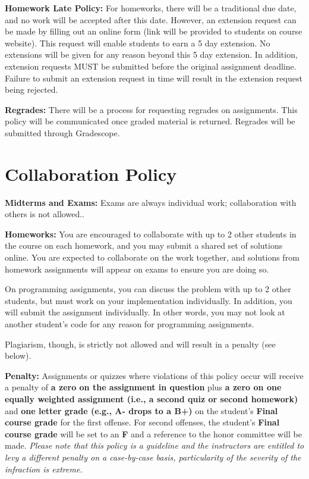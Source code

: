 \documentclass[12pt]{article}
\begin{document}
\textbf{Homework Late Policy:} For homeworks, there will be a traditional due date, and no work will be accepted after this date. However, an extension request can be made by filling out an online form (link will be provided to students on course website). This request will enable students to earn a 5 day extension. No extensions will be given for any reason beyond this 5 day extension. In addition, extension requests MUST be submitted before the original assignment deadline. Failure to submit an extension request in time will result in the extension request being rejected.

\textbf{Regrades:} There will be a process for requesting regrades on assignments. This policy will be communicated once graded material is returned. Regrades will be submitted through Gradescope.

\section*{Collaboration Policy}

\textbf{Midterms and Exams:} Exams are always individual work; collaboration with others is not allowed..

\textbf{Homeworks:} You are encouraged to collaborate with up to 2 other students in the course on each homework, and you may submit a shared set of solutions online. You are expected to collaborate on the work together, and solutions from homework assignments will appear on exams to ensure you are doing so.

On programming assignments, you can discuss the problem with up to 2 other students, but must work on your implementation individually. In addition, you will submit the assignment individually. In other words, you may not look at another student's code for any reason for programming assignments.

Plagiarism, though, is strictly not allowed and will result in a penalty (see below).

\textbf{Penalty:} Assignments or quizzes where violations of this policy occur will receive a penalty of \textbf{a zero on the assignment in question} plus \textbf{a zero on one equally weighted assignment (i.e., a second quiz or second homework)} and \textbf{one letter grade (e.g., A- drops to a B+)} on the student's \textbf{Final course grade} for the first offense. For second offenses, the student's \textbf{Final course grade} will be set to an \textbf{F} and a reference to the honor committee will be made. \emph{Please note that this policy is a guideline and the instructors are entitled to levy a different penalty on a case-by-case basis, particularity of the severity of the infraction is extreme.}
\end{document}
